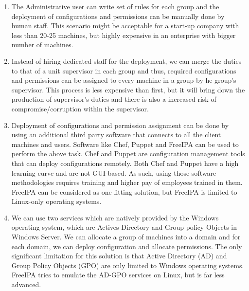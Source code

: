 \documentclass[12pt]{extarticle}
\newcommand{\ben}{\begin{enumerate}}
\newcommand{\een}{\end{enumerate}}
\begin{document}
\ben

	\item  The Administrative user can write set of rules for each group and the deployment of configurations and permissions can be manually done by human staff. This scenario might be acceptable for a start-up company with less than 20-25 machines, but highly expensive in an enterprise with bigger number of machines.

	\item  Instead of hiring dedicated staff for the deployment, we can merge the duties to that of a unit supervisor in each group and thus, required configurations and permissions can be assigned to every machine in a group by he group's supervisor. This process is less expensive than first, but it will bring down the production of supervisor's duties and there is also a increased risk of compromise/corruption within the supervisor. 

	\item  Deployment of configurations and permission assignment can be done by using an additional third party software that connects to all the client machines and users. Software like Chef, Puppet and FreeIPA can be used to perform the above task. Chef and Puppet are configuration management tools that can deploy configurations remotely. Both Chef and Puppet have a high learning curve and are not GUI-based. As such, using those software methodologies requires training and higher pay of employees trained in them. FreeIPA can be considered as one fitting solution, but FreeIPA is limited to Linux-only operating systems.

	\item  We can use two services which are natively provided by the Windows operating system, which are Actives Directory and Group policy Objects in Windows Server. We can allocate a group of machines into a domain and for each domain, we can deploy configuration and allocate permissions. The only significant limitation for this solution is that Active Directory (AD) and Group Policy Objects (GPO) are only limited to Windows operating systems. FreeIPA tries to emulate the AD-GPO services on Linux, but is far less advanced.  

\een


\end{document}
